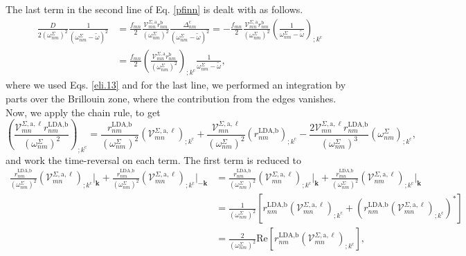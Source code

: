 \documentclass[letterpaper,aps]{revtex4}
\begin{document}
The last term in the second line of Eq. \eqref{pfinn} is dealt with as
follows.
\begin{align}\label{dresn}
\frac{D}{2(\omega^\Sigma_{nm})^2}\frac{1}{(\omega^\Sigma_{nm}-\tilde\omega)^2}
&=
\frac{f_{mn}}{2}\frac{\mathcal{V}^{\Sigma,\mathrm{a}}_{mn}r^{\mathrm{b}}_{nm}}{(\omega^\Sigma_{nm})^2}
\frac{\Delta^{\mathrm{c}}_{nm}}{(\omega^\Sigma_{nm}-\tilde\omega)^2} 
=
-
\frac{f_{mn}}{2}
\frac{\mathcal{V}^{\Sigma,\mathrm{a}}_{mn}r^{\mathrm{b}}_{nm}}{(\omega^\Sigma_{nm})^2}
\left(
\frac{1}{\omega^\Sigma_{nm}-\tilde\omega}
\right)_{;k^{\mathrm{c}}}
\nonumber\\
&=
\frac{f_{mn}}{2}
\left(
\frac{\mathcal{V}^{\Sigma,\mathrm{a}}_{mn}r^{\mathrm{b}}_{nm}}{(\omega^\Sigma_{nm})^2}
\right)_{;k^{\mathrm{c}}}
\frac{1}{\omega^\Sigma_{nm}-\tilde\omega}
,
\end{align} 
where we used Eqs. \eqref{eli.13}  and for the last
line, we performed an
integration by parts over the Brillouin zone,
where the contribution from the edges vanishes.\cite{ashcroftbook}
Now, we apply the chain rule, to get
\begin{equation}\label{chr}
    \left(\frac{\mathcal{V}^{\Sigma,\text{a},\ell}_{mn}r^{\text{LDA,b}}_{nm}}
    {(\omega^{\Sigma}_{nm})^2}\right)_{;k^{\text{c}}}
=   \frac{r^{\text{LDA,b}}_{nm}}{(\omega^{\Sigma}_{nm})^2}
    \left(\mathcal{V}^{\Sigma,\text{a},\ell}_{mn}\right)_{;k^{\text{c}}}
+   \frac{\mathcal{V}^{\Sigma,\text{a},\ell}_{mn}}{(\omega^{\Sigma}_{nm})^2}
    \left(r^{\text{LDA,b}}_{nm}\right)_{;k^{\text{c}}}
-   \frac{2\mathcal{V}^{\Sigma,\text{a},\ell}_{mn}
    r^{\text{LDA,b}}_{nm}}{(\omega^{\Sigma}_{nm})^3}
    \left(\omega^{\Sigma}_{nm}\right)_{;k^{\text{c}}}
,
\end{equation}
and work the time-reversal on each term.
The first term is reduced to
\begin{align}\label{first_term_gen_deriv}
    \frac{r^{\text{LDA,b}}_{nm}}{(\omega^{\Sigma}_{nm})^{2}}
    \left(\mathcal{V}^{\Sigma,\text{a},\ell}_{mn}\right)
    _{;k^{\text{c}}}\vert_{\mathbf{k}}
+   \frac{r^{\text{LDA,b}}_{nm}}{(\omega^{\Sigma}_{nm})^{2}}
    \left(\mathcal{V}^{\Sigma,\text{a},\ell}_{mn}\right)
    _{;k^{\text{c}}}\vert_{-\mathbf{k}}
&=  \frac{r^{\text{LDA,b}}_{nm}}{(\omega^{\Sigma}_{nm})^{2}}
    \left(\mathcal{V}^{\Sigma,\text{a},\ell}_{mn}\right)
    _{;k^{\text{c}}}\vert_{\mathbf{k}}
+   \frac{r^{\text{LDA,b}}_{mn}}{(\omega^{\Sigma}_{nm})^{2}}
    \left(\mathcal{V}^{\Sigma,\text{a},\ell}_{nm}\right)
    _{;k^{\text{c}}}\vert_{\mathbf{k}}\nonumber\\
&=  \frac{1}{(\omega^{\Sigma}_{nm})^{2}}\left[r^{\text{LDA,b}}_{nm}
    \left(\mathcal{V}^{\Sigma,\text{a},\ell}_{mn}\right)
    _{;k^{\text{c}}}
+   \left(r^{\text{LDA,b}}_{nm}
    \left(\mathcal{V}^{\Sigma,\text{a},\ell}_{mn}\right)
    _{;k^{\text{c}}}\right)^*\right]\nonumber\\
&=  \frac{2}{(\omega^{\Sigma}_{nm})^{2}}\mathrm{Re}\left[r^{\text{LDA,b}}_{nm}
    \left(\mathcal{V}^{\Sigma,\text{a},\ell}_{mn}\right)_{;k^{\text{c}}}\right]
,
\end{align}
\end{document}
